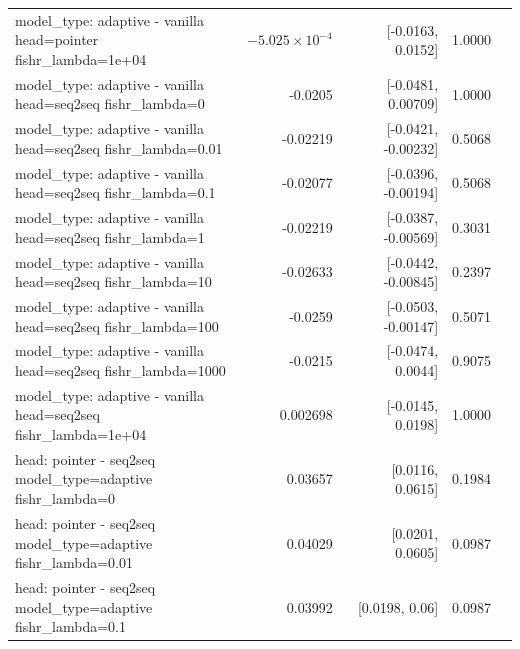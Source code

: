 \documentclass[10pt]{article}
\makeatletter
\newcommand{\stackcell}[1]{\begin{tabular}[t]{@{}l@{}}#1\end{tabular}}
\makeatother
\begin{document}
{\begin{longtable}{lrrrl}
\stackcell{model\_type: adaptive - vanilla\\\footnotesize head=pointer fishr\_lambda=1e+04 } & $-5.025\times10^{-4}$ & [-0.0163, 0.0152] & 1.0000 & \\
\stackcell{model\_type: adaptive - vanilla\\\footnotesize head=seq2seq fishr\_lambda=0 } & -0.0205 & [-0.0481, 0.00709] & 1.0000 & \\
\stackcell{model\_type: adaptive - vanilla\\\footnotesize head=seq2seq fishr\_lambda=0.01 } & -0.02219 & [-0.0421, -0.00232] & 0.5068 & \\
\stackcell{model\_type: adaptive - vanilla\\\footnotesize head=seq2seq fishr\_lambda=0.1 } & -0.02077 & [-0.0396, -0.00194] & 0.5068 & \\
\stackcell{model\_type: adaptive - vanilla\\\footnotesize head=seq2seq fishr\_lambda=1 } & -0.02219 & [-0.0387, -0.00569] & 0.3031 & \\
\stackcell{model\_type: adaptive - vanilla\\\footnotesize head=seq2seq fishr\_lambda=10 } & -0.02633 & [-0.0442, -0.00845] & 0.2397 & \\
\stackcell{model\_type: adaptive - vanilla\\\footnotesize head=seq2seq fishr\_lambda=100 } & -0.0259 & [-0.0503, -0.00147] & 0.5071 & \\
\stackcell{model\_type: adaptive - vanilla\\\footnotesize head=seq2seq fishr\_lambda=1000 } & -0.0215 & [-0.0474, 0.0044] & 0.9075 & \\
\stackcell{model\_type: adaptive - vanilla\\\footnotesize head=seq2seq fishr\_lambda=1e+04 } & 0.002698 & [-0.0145, 0.0198] & 1.0000 & \\
\stackcell{head: pointer - seq2seq\\\footnotesize model\_type=adaptive fishr\_lambda=0 } & 0.03657 & [0.0116, 0.0615] & 0.1984 & \\
\stackcell{head: pointer - seq2seq\\\footnotesize model\_type=adaptive fishr\_lambda=0.01 } & 0.04029 & [0.0201, 0.0605] & 0.0987 & \\
\stackcell{head: pointer - seq2seq\\\footnotesize model\_type=adaptive fishr\_lambda=0.1 } & 0.03992 & [0.0198, 0.06] & 0.0987 & \\

\end{longtable}}
\end{document}
